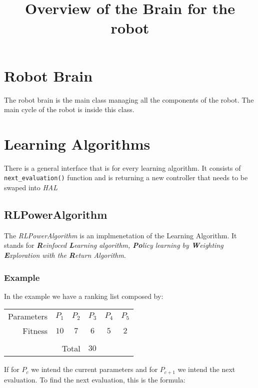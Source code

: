 \documentclass[a4paper,10pt]{article}
\title{Overview of the Brain for the robot}
\author{}
\begin{document}
\maketitle

\tableofcontents

\section{Robot Brain}
The robot brain is the main class managing all the components of the robot.
The main cycle of the robot is inside this class.

\section{Learning Algorithms}
There is a general interface that is for every learning algorithm. It consists 
of \verb|next_evaluation()| function and is returning a new controller that 
needs to be swaped into \emph{HAL}

\subsection{RLPowerAlgorithm}
The \emph{RLPowerAlgorithm} is an implmenetation of the Learning Algorithm. It
stands for \emph{\textbf{R}einfoced \textbf{L}earning algorithm, 
\textbf{Po}licy learning by \textbf{W}eighting \textbf{E}xploration with the 
\textbf{R}eturn Algorithm}.


\subsubsection{Example}
In the example we have a ranking list composed by:

\begin{center}
\begin{tabular}[c]{r *{5}{c}}
 Parameters & $P_1$ & $P_2$ & $P_3$ & $P_4$ & $P_5$ \\
 Fitness    & $10$  & $7$   & $6$   & $5$   & $2$   \\
 \\
 \multicolumn{3}{r}{Total} & \multicolumn{3}{l}{$30$} \\
\end{tabular}
\end{center}

If for $P_c$ we intend the current parameters and for $P_{c+1}$ we intend the
next evaluation. To find the next evaluation, this is the formula:
\end{document}
